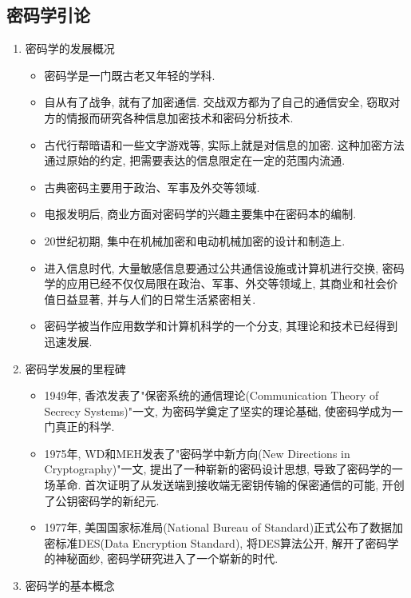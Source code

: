 \documentclass[UTF8]{ctexart}
\begin{document}
    \subsection{密码学引论}
    \begin{enumerate}
        \item 密码学的发展概况
        \begin{itemize}
            \item 密码学是一门既古老又年轻的学科.
            \item 自从有了战争, 就有了加密通信. 交战双方都为了自己的通信安全, 窃取对方的情报而研究各种信息加密技术和密码分析技术.
            \item 古代行帮暗语和一些文字游戏等, 实际上就是对信息的加密. 这种加密方法通过原始的约定, 把需要表达的信息限定在一定的范围内流通.
            \item 古典密码主要用于政治、军事及外交等领域.
            \item 电报发明后, 商业方面对密码学的兴趣主要集中在密码本的编制.
            \item 20世纪初期, 集中在机械加密和电动机械加密的设计和制造上.
            \item 进入信息时代, 大量敏感信息要通过公共通信设施或计算机进行交换, 密码学的应用已经不仅仅局限在政治、军事、外交等领域上, 其商业和社会价值日益显著, 并与人们的日常生活紧密相关.
            \item 密码学被当作应用数学和计算机科学的一个分支, 其理论和技术已经得到迅速发展.
        \end{itemize}
        \item 密码学发展的里程碑
        \begin{itemize}
            \item 1949年, 香浓发表了"保密系统的通信理论(Communication Theory of Secrecy Systems)"一文, 为密码学奠定了坚实的理论基础, 使密码学成为一门真正的科学.
            \item 1975年, WD和MEH发表了"密码学中新方向(New Directions in Cryptography)"一文, 提出了一种崭新的密码设计思想, 导致了密码学的一场革命. 首次证明了从发送端到接收端无密钥传输的保密通信的可能, 开创了公钥密码学的新纪元.
            \item 1977年, 美国国家标准局(National Bureau of Standard)正式公布了数据加密标准DES(Data Encryption Standard), 将DES算法公开, 解开了密码学的神秘面纱, 密码学研究进入了一个崭新的时代.
        \end{itemize}
        \item 密码学的基本概念
        \begin{enumerate}

\end{enumerate}
\end{enumerate}
\end{document}
